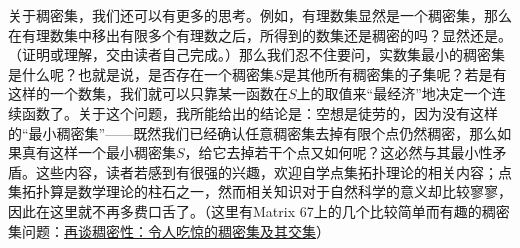 \documentclass[12pt,a4paper]{article}
\begin{document}
{{			关于稠密集，我们还可以有更多的思考。例如，有理数集显然是一个稠密集，那么在有理数集中移出有限多个有理数之后，所得到的数集还是稠密的吗？显然还是。（证明或理解，交由读者自己完成。）那么我们忍不住要问，实数集最小的稠密集是什么呢？也就是说，是否存在一个稠密集$S$是其他所有稠密集的子集呢？若是有这样的一个数集，我们就可以只靠某一函数在$S$上的取值来“最经济”地决定一个连续函数了。关于这个问题，我所能给出的结论是：空想是徒劳的，因为没有这样的“最小稠密集”——既然我们已经确认任意稠密集去掉有限个点仍然稠密，那么如果真有这样一个最小稠密集$S$，给它去掉若干个点又如何呢？这必然与其最小性矛盾。这些内容，读者若感到有很强的兴趣，欢迎自学点集拓扑理论的相关内容；点集拓扑算是数学理论的柱石之一，然而相关知识对于自然科学的意义却比较寥寥，因此在这里就不再多费口舌了。（这里有Matrix 67上的几个比较简单而有趣的稠密集问题：\href{http://www.matrix67.com/blog/archives/1480}{\underline {再谈稠密性：令人吃惊的稠密集及其交集}}）
			
		}
	}
	\newpage
\end{document}
